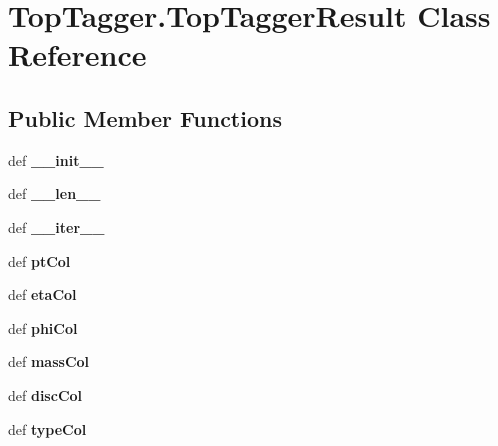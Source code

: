 \hypertarget{classTopTagger_1_1TopTaggerResult}{\section{Top\-Tagger.\-Top\-Tagger\-Result Class Reference}
\label{classTopTagger_1_1TopTaggerResult}
}
\subsection*{Public Member Functions}
\begin{DoxyCompactItemize}
\item 
\hypertarget{classTopTagger_1_1TopTaggerResult_aad1eaf2adaf99ff9f91221c88901dd69}{def {\bfseries \-\_\-\-\_\-init\-\_\-\-\_\-}}\label{classTopTagger_1_1TopTaggerResult_aad1eaf2adaf99ff9f91221c88901dd69}

\item 
\hypertarget{classTopTagger_1_1TopTaggerResult_ac12e28eac79f627697ee39ea0ad1e891}{def {\bfseries \-\_\-\-\_\-len\-\_\-\-\_\-}}\label{classTopTagger_1_1TopTaggerResult_ac12e28eac79f627697ee39ea0ad1e891}

\item 
\hypertarget{classTopTagger_1_1TopTaggerResult_af6d7a28866c54d7b6251e6e107b4bc3e}{def {\bfseries \-\_\-\-\_\-iter\-\_\-\-\_\-}}\label{classTopTagger_1_1TopTaggerResult_af6d7a28866c54d7b6251e6e107b4bc3e}

\item 
\hypertarget{classTopTagger_1_1TopTaggerResult_a208c32e56b8c12070b8f5ffe01e2c549}{def {\bfseries pt\-Col}}\label{classTopTagger_1_1TopTaggerResult_a208c32e56b8c12070b8f5ffe01e2c549}

\item 
\hypertarget{classTopTagger_1_1TopTaggerResult_a317424d14d152695ff7306ac4b80f231}{def {\bfseries eta\-Col}}\label{classTopTagger_1_1TopTaggerResult_a317424d14d152695ff7306ac4b80f231}

\item 
\hypertarget{classTopTagger_1_1TopTaggerResult_a04eb7ee0366cb165caa9c02ca13cef13}{def {\bfseries phi\-Col}}\label{classTopTagger_1_1TopTaggerResult_a04eb7ee0366cb165caa9c02ca13cef13}

\item 
\hypertarget{classTopTagger_1_1TopTaggerResult_a449fe51a1fc16da4043d9a25b762b7c2}{def {\bfseries mass\-Col}}\label{classTopTagger_1_1TopTaggerResult_a449fe51a1fc16da4043d9a25b762b7c2}

\item 
\hypertarget{classTopTagger_1_1TopTaggerResult_a32f5571bb549f945142321c052a48b0e}{def {\bfseries disc\-Col}}\label{classTopTagger_1_1TopTaggerResult_a32f5571bb549f945142321c052a48b0e}

\item 
\hypertarget{classTopTagger_1_1TopTaggerResult_ad5f834f8c5f222968cf097c90ae40727}{def {\bfseries type\-Col}}\label{classTopTagger_1_1TopTaggerResult_ad5f834f8c5f222968cf097c90ae40727}

\end{DoxyCompactItemize}
